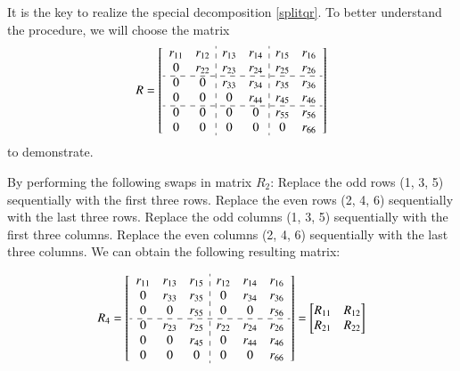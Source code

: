 \documentclass[1p]{elsarticle}
\numberwithin{equation}{section}
\begin{document}
 It is the key to realize the special decomposition \eqref{splitqr}. To better understand the procedure, we will choose the matrix 
\[R= \begin{bmatrix}
\begin{array}{cc:cc:cc}
 r_{11} & r_{12} & r_{13} & r_{14} & r_{15} & r_{16}\\
 0 & r_{22} & r_{23} & r_{24} & r_{25} & r_{26}\\
 \cdashline{1-6}
 0      & 0      & r_{33} & r_{34} & r_{35} & r_{36}\\
 0      & 0      & 0 & r_{44} & r_{45} & r_{46}\\
 \cdashline{1-6}
 0      & 0      & 0      & 0      & r_{55} & r_{56}\\
 0      & 0      & 0      & 0      & 0 & r_{66}\\
\end{array}
\end{bmatrix}
\]
to demonstrate. 

By performing the following swaps in matrix $R_2$: Replace the odd rows (1, 3, 5) sequentially with the first three rows. Replace the even rows (2, 4, 6) sequentially with the last three rows. Replace the odd columns (1, 3, 5) sequentially with the first three columns. Replace the even columns (2, 4, 6) sequentially with the last three columns. We can obtain the following  resulting matrix:

\begin{equation*}
R_4 = \begin{bmatrix}
\begin{array}{ccc:ccc}
 r_{11} & r_{13} & r_{15} & r_{12} & r_{14} & r_{16}\\
 0      & r_{33} & r_{35} & 0      & r_{34} & r_{36}\\
 0      & 0      & r_{55} & 0      & 0      & r_{56}\\
 \cdashline{1-6}
0 & r_{23} & r_{25} & r_{22} & r_{24} & r_{26}\\
 0      & 0 & r_{45} & 0      & r_{44} & r_{46}\\
 0      & 0      & 0 & 0      & 0      & r_{66}\\
\end{array}
\end{bmatrix}=\begin{bmatrix}
    R_{11} & R_{12}\\R_{21} & R_{22}
\end{bmatrix}
\end{equation*}
\end{document}
